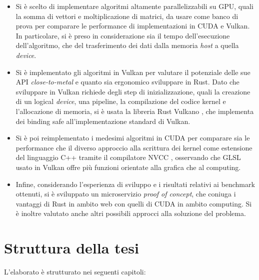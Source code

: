 \begin{itemize}
    \item Si è scelto di implementare algoritmi altamente parallelizzabili su \gls{GPU}, quali la somma di vettori e moltiplicazione di matrici, da usare come banco di prova per comparare le performance di implementazioni in \gls{CUDA} e Vulkan. In particolare, si è preso in considerazione sia il tempo dell'esecuzione dell'algoritmo, che del trasferimento dei dati dalla memoria \textit{host} a quella \textit{device}.
    \item Si è implementato gli algoritmi in Vulkan per valutare il potenziale delle sue \gls{API} \textit{close-to-metal} e quanto sia ergonomico sviluppare in Rust. Dato che sviluppare in Vulkan richiede degli step di inizializzazione, quali la creazione di un logical \textit{device}, una pipeline, la compilazione del codice kernel e l'allocazione di memoria, si è usata la libreria Rust Vulkano \cite[]{Rust:Vulkano}, che implementa dei binding safe all'implementazione standard di Vulkan.
    \item Si è poi reimplementato i medesimi algoritmi in \gls{CUDA} per comparare sia le performance che il diverso approccio alla scrittura dei kernel come estensione del linguaggio C++ tramite il compilatore \gls{NVCC} \cite[]{NVIDIA:nvcc}, osservando che GLSL \cite[]{KG:GLSL} usato in Vulkan offre più funzioni orientate alla grafica che al computing.
    \item Infine, considerando l'esperienza di sviluppo e i risultati relativi ai benchmark ottenuti, si è sviluppato un microservizio \textit{proof of concept}, che coniuga i vantaggi di Rust in ambito web con quelli di \gls{CUDA} in ambito computing. Si è inoltre valutato anche altri possibili approcci alla soluzione del problema.
\end{itemize}



\section[Struttura della tesi]{Struttura della tesi}

L'elaborato è strutturato nei seguenti capitoli:

